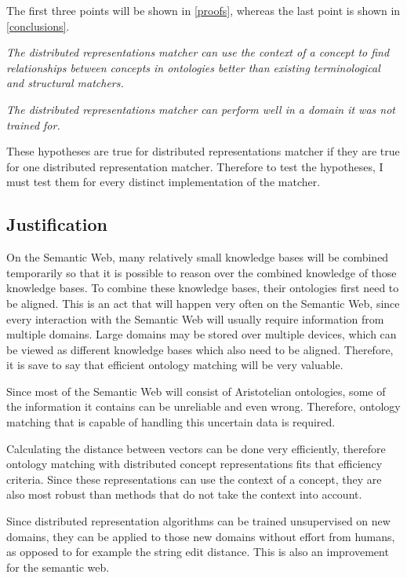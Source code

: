 \documentclass{article}
\begin{document}
 The first three points will be shown in \ref{proofs}, whereas the last point is shown in \ref{conclusions}.
 
 \begin{center} 
 \textit{The distributed representations matcher can use the context of a concept to find relationships between concepts in ontologies better than existing terminological and structural matchers.}
 \end{center}
 \begin{center}
 \textit{The distributed representations matcher can perform well in a domain it was not trained for.}
 \end{center}
 
 These hypotheses are true for distributed representations matcher if they are true for one distributed representation matcher. Therefore to test the hypotheses, I must test them for every distinct implementation of the matcher.
 
 \subsection{Justification}
 On the Semantic Web, many relatively small knowledge bases will be combined temporarily so that it is possible to reason over the combined knowledge of those knowledge bases. To combine these knowledge bases, their ontologies first need to be aligned. This is an act that will happen very often on the Semantic Web, since every interaction with the Semantic Web will usually require information from multiple domains. Large domains may be stored over multiple devices, which can be viewed as different knowledge bases which also need to be aligned. Therefore, it is save to say that efficient ontology matching will be very valuable.
 
 Since most of the Semantic Web will consist of Aristotelian ontologies, some of the information it contains can be unreliable and even wrong. Therefore, ontology matching that is capable of handling this uncertain data is required.
 
 Calculating the distance between vectors can be done very efficiently, therefore ontology matching with distributed concept representations fits that efficiency criteria. Since these representations can use the context of a concept, they are also most robust than methods that do not take the context into account.
 
 Since distributed representation algorithms can be trained unsupervised on new domains, they can be applied to those new domains without effort from humans, as opposed to for example the string edit distance. This is also an improvement for the semantic web.
 
\end{document}
